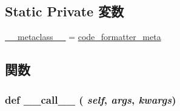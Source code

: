 \subsection*{Static Private 変数}
\begin{DoxyCompactItemize}
\item 
\hyperlink{classm5_1_1util_1_1code__formatter_1_1code__formatter_adfc4d1824f4ecdcbb04ceafc5bbc933e}{\_\-\_\-metaclass\_\-\_\-} = \hyperlink{classm5_1_1util_1_1code__formatter_1_1code__formatter__meta}{code\_\-formatter\_\-meta}
\end{DoxyCompactItemize}


\subsection{関数}
\hypertarget{classm5_1_1util_1_1code__formatter_1_1code__formatter_ae844e0019d38360a86bac1474132db3c}{
\subsubsection[{\_\-\_\-call\_\-\_\-}]{\setlength{\rightskip}{0pt plus 5cm}def \_\-\_\-call\_\-\_\- ( {\em self}, \/   {\em args}, \/   {\em kwargs})}}
\label{classm5_1_1util_1_1code__formatter_1_1code__formatter_ae844e0019d38360a86bac1474132db3c}



